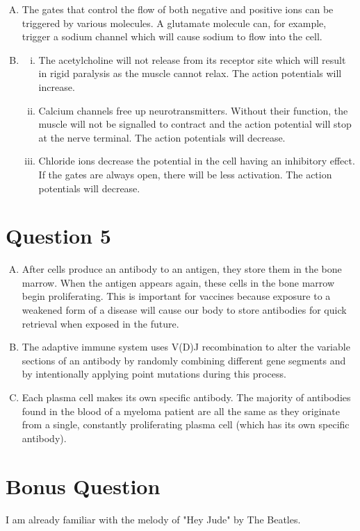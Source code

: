 \documentclass{article}
\begin{document}
\begin{enumerate}[A.]
    \item The gates that control the flow of both negative and positive ions can
        be triggered by various molecules. A glutamate molecule can, for
        example, trigger a sodium channel which will cause sodium to flow into
        the cell.

    \item 
        \begin{enumerate}[i.]
            \item The acetylcholine will not release from its receptor site
                which will result in rigid paralysis as the muscle cannot relax.
                The action potentials will increase.

            \item Calcium channels free up neurotransmitters. Without their
                function, the muscle will not be signalled to contract and the
                action potential will stop at the nerve terminal. The action
                potentials will decrease.

            \item Chloride ions decrease the potential in the cell having an
                inhibitory effect. If the gates are always open, there will be
                less activation. The action potentials will decrease.
        \end{enumerate}
\end{enumerate}

\section*{ Question 5 }

\begin{enumerate}[A.]
    \item After cells produce an antibody to an antigen, they store them in the
        bone marrow. When the antigen appears again, these cells in the bone
        marrow begin proliferating. This is important for vaccines because
        exposure to a weakened form of a disease will cause our body to store
        antibodies for quick retrieval when exposed in the future.

    \item The adaptive immune system uses V(D)J recombination to alter the
        variable sections of an antibody by randomly combining different gene
        segments and by intentionally applying point mutations during this
        process.

    \item Each plasma cell makes its own specific antibody. The majority of
        antibodies found in the blood of a myeloma patient are all the same as
        they originate from a single, constantly proliferating plasma cell
        (which has its own specific antibody).
\end{enumerate}

\section*{ Bonus Question }

I am already familiar with the melody of "Hey Jude" by The Beatles.
\end{document}
